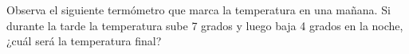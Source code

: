 Observa el siguiente termómetro que marca la temperatura en una mañana. Si durante la tarde la temperatura sube 7 grados y luego baja 4 grados en la noche, ¿cuál será la temperatura final?

\begin{center}
\end{center}
